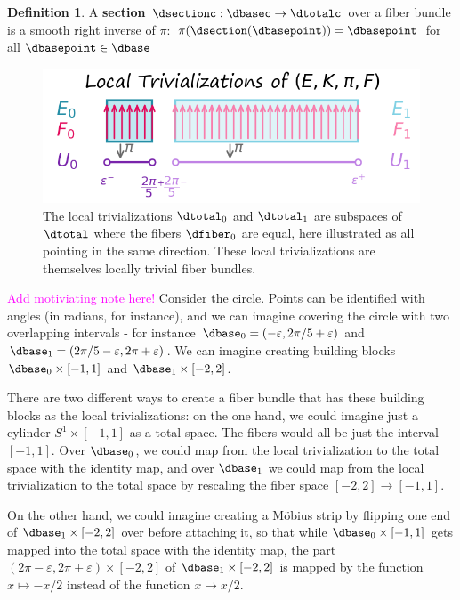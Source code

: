 \documentclass[journal]{IEEEtran}
\newcommand{\note}[1]{\textcolor{magenta}{#1}}
\theoremstyle{definition}
\newtheorem{definition}{Definition}[section]
\theoremstyle{remark}
\begin{document}
\begin{definition} A \textcolor{section}{\textbf{section}} $\dsectionc: \dbasec \rightarrow \dtotalc$ over a fiber bundle is a smooth right inverse of $\pi$: $\pi(\dsection(\dbasepoint)) = \dbasepoint$ for all $\dbasepoint \in \dbase$
\end{definition}

\begin{figure}[H]
  \includegraphics[width=\columnwidth]{figures/local_trivalizations.png}
  \caption{The local trivializations $\dtotal_{0}$ and $\dtotal_{1}$ are subspaces of $\dtotal$ where the fibers $\dfiber_{0}$ are equal, here illustrated as all pointing in the same direction. These local trivializations are themselves locally trivial fiber bundles.}
  \label{fig:atct:local_trivalizations}
\end{figure}

\note{Add motiviating note here!}
Consider the circle. Points can be identified with angles (in radians, for instance), and we can imagine covering the circle with two overlapping intervals - for instance $\dbase_0=(-\varepsilon, 2\pi/5+\varepsilon)$ and $\dbase_1=(2\pi/5-\varepsilon, 2\pi+\varepsilon)$. We can imagine creating building blocks $\dbase_0\times[-1,1]$ and $\dbase_1\times[-2,2]$.

There are two different ways to create a fiber bundle that has these building blocks as the local trivializations: on the one hand, we could imagine just a cylinder $S^1\times[-1,1]$ as a total space. The fibers would all be just the interval $[-1,1]$. Over $\dbase_0$, we could map from the local trivialization to the total space with the identity map, and over $\dbase_1$ we could map from the local trivialization to the total space by rescaling the fiber space $[-2,2]\to[-1,1]$.

On the other hand, we could imagine creating a Möbius strip by flipping one end of $\dbase_1\times[-2,2]$ over before attaching it, so that while $\dbase_0\times[-1,1]$ gets mapped into the total space with the identity map, the part $(2\pi-\varepsilon,2\pi+\varepsilon)\times[-2,2]$ of $\dbase_1\times[-2,2]$ is mapped by the function $x\mapsto -x/2$ instead of the function $x\mapsto x/2$.
\end{document}
